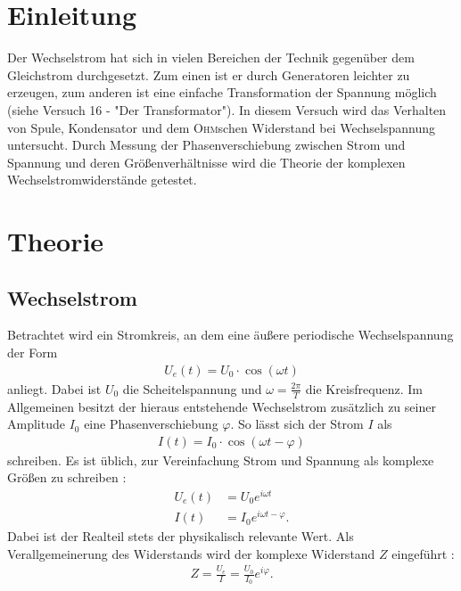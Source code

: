 \documentclass[12pt,a4paper,titlepage,headinclude]{scrartcl}
\numberwithin{equation}{subsection}
\newcommand{\person}[1]{\textsc{#1}}
\begin{document}
\cleardoublepage
\tableofcontents
\thispagestyle{empty}
\cleardoublepage

\setcounter{footnote}{0}
\setcounter{page}{1}


\newpage

\section{Einleitung}
\label{sec:einleitung}
Der Wechselstrom hat sich in vielen Bereichen der Technik gegenüber dem Gleichstrom durchgesetzt. Zum einen ist er durch Generatoren leichter zu erzeugen, zum anderen ist eine einfache Transformation der Spannung möglich (siehe Versuch 16 - "Der Transformator"). In diesem Versuch wird das Verhalten von Spule, Kondensator und dem \person{Ohm}schen Widerstand bei Wechselspannung untersucht. Durch Messung der Phasenverschiebung zwischen Strom und Spannung und deren Größenverhältnisse wird die Theorie der komplexen Wechselstromwiderstände getestet.
\section{Theorie}
\subsection{Wechselstrom}
\label{sec:theorie}
Betrachtet wird ein Stromkreis, an dem eine äußere periodische Wechselspannung der Form
\begin{align}
	U_e(t)=U_0\cdot\cos(\omega t)
	\label{eq:wechselspannung}
\end{align}
anliegt. Dabei ist $U_0$ die Scheitelspannung und $\omega=\frac{2\pi}{T}$ die Kreisfrequenz. Im Allgemeinen besitzt der hieraus entstehende Wechselstrom zusätzlich zu seiner Amplitude $I_0$ eine Phasenverschiebung $\varphi$. So lässt sich der Strom $I$ als
\begin{align}
	I(t)=I_0\cdot\cos(\omega t-\varphi)
	\label{eq:wechselstrom}
\end{align}
schreiben. Es ist üblich, zur Vereinfachung Strom und Spannung als komplexe Größen zu schreiben \cite[253]{nol3}:
\begin{align}
	U_e(t)&=U_0e^{i\omega t}
	\label{eq:complexspannung}\\
	I(t)&=I_0e^{i\omega t-\varphi}.
	\label{eq:complexstrom}
\end{align}
Dabei ist der Realteil stets der physikalisch relevante Wert.
Als Verallgemeinerung des Widerstands wird der komplexe Widerstand $Z$ eingeführt \cite[254]{nol3}:
\begin{align}
	Z=\frac{U_e}{I}=\frac{U_0}{I_0}e^{i\varphi}.
	\label{eq:z}
\end{align}
\end{document}
